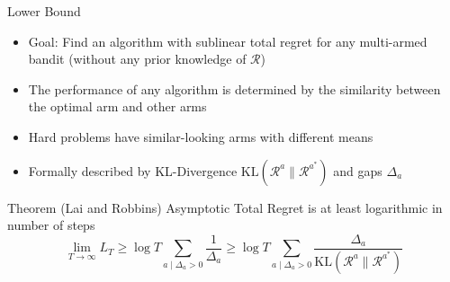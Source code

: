 \begin{frame}{Lower Bound}
\begin{itemize}
    \item Goal: Find an algorithm with sublinear total regret for any
          multi-armed bandit (without any prior knowledge of $\mathcal{R}$)
    \item The performance of any algorithm is determined by the similarity
          between the optimal arm and other arms
    \item Hard problems have similar-looking arms with different means
    \item Formally described by KL-Divergence $\mathrm{KL}(\mathcal{R}^a \| \mathcal{R}^{a^*})$ and gaps $\Delta_a$
\end{itemize}
\begin{block}{Theorem (Lai and Robbins)}
Asymptotic Total Regret is at least logarithmic in number of steps
\[
    \lim_{T \to \infty} L_T \geq \log T \sum_{a \mid \Delta_a > 0} \frac{1}{\Delta_a}
    \geq \log T \sum_{a \mid \Delta_a > 0} \frac{\Delta_a}{\mathrm{KL}(\mathcal{R}^a \| \mathcal{R}^{a^*})}
\]
\end{block}
\end{frame}
